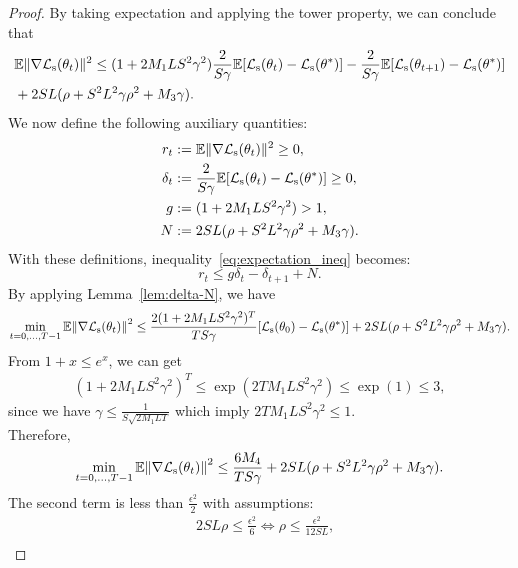 \documentclass{article}
\theoremstyle{plain}
\theoremstyle{definition}
\theoremstyle{remark}
\newcommand{\no}[1]{{\left\lVert #1 \right\rVert}}
\begin{document}
\begin{proof}
    By taking expectation and applying the tower property, we can conclude that
    \begin{align}\label{eq:expectation_ineq}
         &\mathbb{E}\|\nabla {\mathcal{L}}_{\text{s}}(\theta_t)\|^2 \leq (1 + 2M_1LS^2\gamma^2)\frac{2}{S\gamma}\mathbb{E}[{\mathcal{L}}_{\text{s}}(\theta_t) - {\mathcal{L}}_{\text{s}}(\theta^*)]-  \frac{2}{S\gamma}\mathbb{E}[{\mathcal{L}}_{\text{s}}(\theta_{t+1}) - {\mathcal{L}}_{\text{s}}(\theta^*)] \notag\\ &+ 2SL(\rho + S^2L^2\gamma\rho^2 + M_3\gamma).
    \end{align}
    We now define the following auxiliary quantities:
    \begin{align*}
        r_t &:= \mathbb{E}\|\nabla {\mathcal{L}}_{\text{s}}(\theta_t)\|^2\geq0, \\
        \delta_t&:= \frac{2}{S\gamma}\mathbb{E}[{\mathcal{L}}_{\text{s}}(\theta_t) - {\mathcal{L}}_{\text{s}}(\theta^*)]\geq0,\\
        g &:= (1+2M_1LS^2\gamma^2) > 1, \\
        N &:= 2SL(\rho + S^2L^2\gamma\rho^2 + M_3\gamma).
    \end{align*}
    With these definitions, inequality~\ref{eq:expectation_ineq} becomes:
    \begin{equation*}\label{eq:lem_ineq}
        r_t\leq g\delta_t-\delta_{t+1}+N.
    \end{equation*}
    By applying Lemma~\ref{lem:delta-N}, we have
    \begin{align*}\label{eq:final_ineq_2}
        \min_{t=0,\dots,T-1} \E\no{\nabla\gL_{\text{s}}(\theta_t)}^2 \leq\frac{2(1+2M_1LS^2\gamma^2)^T}{TS\gamma}[\gL_{\text{s}}(\theta_0) - \gL_{\text{s}}(\theta^*)]+2SL(\rho + S^2L^2\gamma\rho^2 + M_3\gamma).
    \end{align*}
    From \(1+x\leq e^x\), we can get
    \begin{align*}
        (1+2M_1LS^2\gamma^2)^T\leq \exp(2TM_1LS^2\gamma^2) \leq \exp(1)\leq 3, 
    \end{align*}
    since we have \(\gamma\leq\frac{1}{S\sqrt{2M_1LT}}\) which imply \(2TM_1LS^2\gamma^2 \leq 1\).\\
    Therefore,
    \begin{align*}
        \min_{t=0,\dots,T-1} \E\no{\nabla\gL_{\text{s}}(\theta_t)}^2 \leq\frac{6M_4}{TS\gamma}+2SL(\rho + S^2L^2\gamma\rho^2 + M_3\gamma).
    \end{align*}
    The second term is less than \(\frac{\epsilon^2}{2}\) with assumptions:
    \begin{align*}
        &2SL\rho \leq \frac{\epsilon^2}{6} \iff \rho \leq \frac{\epsilon^2}{12SL},\\

\end{align*}
\end{proof}
\end{document}
